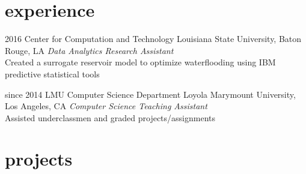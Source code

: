 \documentclass[]{friggeri-cv} %
\begin{document}

\section{experience}

  \begin{entrylist}


    \entry
      {2016}
      {Center for Computation and Technology}
      {Louisiana State University, Baton Rouge, LA}
      {\emph{Data Analytics Research Assistant} \\
	Created a surrogate reservoir model to optimize waterflooding using IBM predictive statistical tools}
	  



    \entry
      {since 2014}
      {LMU Computer Science Department}
      {Loyola Marymount University, Los Angeles, CA}
      {\emph{Computer Science Teaching Assistant} \\
        Assisted underclassmen and graded projects/assignments}


\end{entrylist}


\section{projects}
\end{document}
